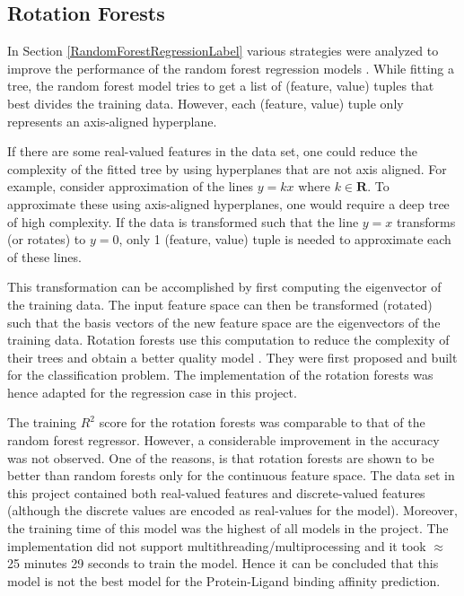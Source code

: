 \documentclass[11pt]{article}
\begin{document}
\subsection{Rotation Forests}

In Section \ref{RandomForestRegressionLabel} various strategies were analyzed to improve the performance of the random forest regression models \cite{bagnall2020rotation}.
While fitting a tree, the random forest model tries to get a list of (feature, value) tuples that best divides the training data.
However,  each (feature, value) tuple only represents an axis-aligned hyperplane.

If there are some real-valued features in the data set,  one could reduce the complexity of the fitted tree by using hyperplanes that are not axis aligned.
For example, consider approximation of the lines $y = kx$ where $k \in \mathbf{R}$.
To approximate these using axis-aligned hyperplanes,  one would require a deep tree of high complexity.
If the data is transformed such that the line $y = x$ transforms (or rotates) to $y = 0$,  only 1 (feature, value) tuple is needed to approximate each of these lines.

This transformation can be accomplished by first computing the eigenvector of the training data. The input feature space can then be transformed (rotated) such that the basis vectors of the new feature space are the eigenvectors of the training data.
Rotation forests use this computation to reduce the complexity of their trees and obtain a better quality model \cite{rotationforestpaper2}.
They were first proposed and built for the classification problem. The implementation of the rotation forests was hence adapted for the regression case in this project.

The training $R^2$ score for the rotation forests was comparable to that of the random forest regressor.
However,  a considerable improvement in the accuracy was not observed.
One of the reasons,  is that rotation forests are shown to be better than random forests only for the continuous feature space.
The data set in this project contained both real-valued features and discrete-valued features (although the discrete values are encoded as real-values for the model).
Moreover, the training time of this model was the highest of all models in the project.
The implementation did not support multithreading/multiprocessing and it took $\approx$ 25 minutes 29 seconds to train the model.
Hence it can be concluded that this model is not the best model for the Protein-Ligand binding affinity prediction.
\end{document}
